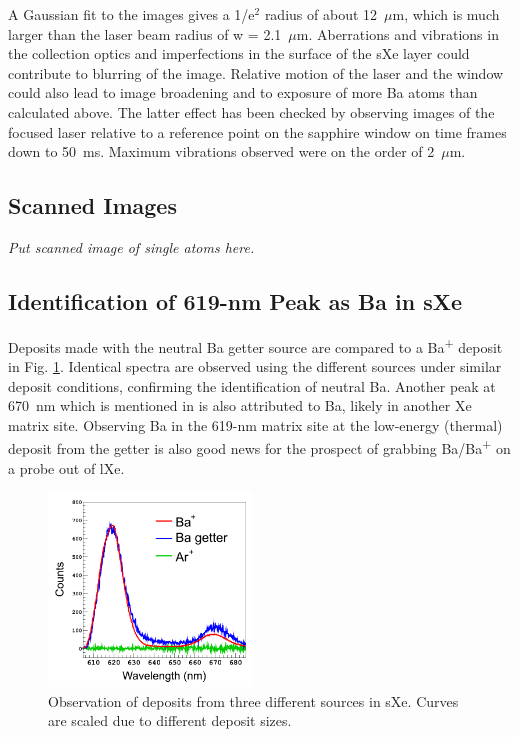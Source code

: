 \documentclass[aps,pra,reprint,superscriptaddress]{revtex4-1}
\begin{document}
A Gaussian fit to the images gives a 1/e$^{2}$ radius of about 12~$\mu$m, which is much larger than the laser beam radius of w = 2.1~$\mu$m.  Aberrations and vibrations in the collection optics and imperfections in the surface of the sXe layer could contribute to blurring of the image.  Relative motion of the laser and the window could also lead to image broadening and to exposure of more Ba atoms than calculated above.  {\color{blue}The latter effect has been checked by observing images of the focused laser relative to a reference point on the sapphire window on time frames down to 50~ms.  Maximum vibrations observed were on the order of 2~$\mu$m.}

\subsection{Scanned Images}

\emph{\color{blue}Put scanned image of single atoms here.}

\subsection{Identification of 619-nm Peak as Ba in sXe}

Deposits made with the neutral Ba getter source are compared to a Ba\textsuperscript{+} deposit in Fig. \ref{fig:ion_getter_ar}.  Identical spectra are observed using the different sources under similar deposit conditions, confirming the identification of neutral Ba.  Another peak at 670~nm which is mentioned in \cite{Mong2015} is also attributed to Ba, likely in another Xe matrix site.  Observing Ba in the 619-nm matrix site at the low-energy (thermal) deposit from the getter is also good news for the prospect of grabbing Ba/Ba\textsuperscript{+} on a probe out of lXe.

\begin{figure}
\includegraphics[width=0.48\textwidth]{figures/getter_ion_Ar_calibrated.png}
\caption{Observation of deposits from three different sources in sXe.  Curves are scaled due to different deposit sizes.}
\label{fig:ion_getter_ar}
\end{figure}
\end{document}
